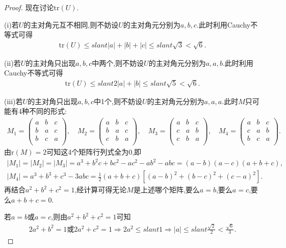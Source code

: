 \documentclass[../../main.tex]{subfiles}
\begin{document}
\begin{proof}
现在讨论$\mathrm{tr}(U)$.

(i)若$U$的主对角元互不相同,则不妨设$U$的主对角元分别为$a,b,c$.此时利用Cauchy不等式可得
\begin{align*}
\mathrm{tr}(U) \leqslant slant |a|+|b|+|c|\leqslant slant \sqrt{3}<\sqrt{6}.
\end{align*}

(ii)若$U$的主对角只出现$a,b,c$中两个,则不妨设$U$的主对角元分别为$a,a,b$.此时利用Cauchy不等式可得
\begin{align*}
\mathrm{tr}(U) \leqslant slant 2|a|+|b|\leqslant slant \sqrt{5}<\sqrt{6}.
\end{align*}

(iii)若$U$的主对角只出现$a,b,c$中1个,则不妨设$U$的主对角元分别为$a,a,a$.此时$M$只可能有4种不同的形式:
\begin{align*}
M_1=\begin{pmatrix}
a&		b&		c\\
b&		a&		c\\
b&		c&		a\\
\end{pmatrix},\quad M_2=\begin{pmatrix}
a&		b&		c\\
b&		a&		c\\
c&		b&		a\\
\end{pmatrix},\quad M_3=\begin{pmatrix}
a&		b&		c\\
c&		a&		b\\
c&		b&		a\\
\end{pmatrix},\quad M_4=\begin{pmatrix}
a&		b&		c\\
c&		a&		b\\
b&		c&		a\\
\end{pmatrix}.
\end{align*}
由$\mathrm{r}(M) =2$可知这4个矩阵行列式全为0,即
\begin{gather*}
|M_1|=|M_2|=|M_3|=a^3+b^2c+bc^2-ac^2-ab^2-abc=(a-b)(a-c)(a+b+c),
\\
|M_4|=a^3+b^3+c^3-3abc=\frac{1}{2}(a+b+c)\left[(a-b)^2+(b-c)^2+(c-a)^2\right].
\end{gather*}
再结合$a^2+b^2+c^2=1$,经计算可得无论$M$是上述哪个矩阵,要么$a=b$,要么$a=c$,要么$a+b+c=0$.

若$a=b$或$a=c$,则由$a^2+b^2+c^2=1$可知
\begin{align*}
2a^2+b^2=1\text{或}2a^2+c^2=1\Rightarrow 2a^2\leqslant slant 1\Rightarrow |a|\leqslant slant \frac{\sqrt{2}}{2}<\frac{\sqrt{6}}{3}.
\end{align*}


\end{proof}
\end{document}
